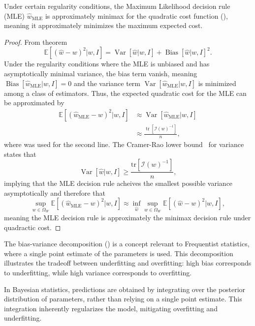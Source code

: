\begin{corollary}
	\label{cor:MLE_minimax}
	Under certain regularity conditions, the Maximum Likelihood decision rule (MLE) $\hat{w}_{\text{MLE}}$ is approximately minimax for the quadratic cost function (), meaning it approximately minimizes the maximum expected cost.
	
	\begin{proof}
		From theorem 
		\begin{equation}
			\mathbb{E}[(\hat{w}-w)^2|w,I] = \operatorname{Var}[\hat{w}|w,I]+\operatorname{Bias}[\hat{w}|w,I]^2.
		\end{equation}
		Under the regularity conditions where the MLE is unbiased and has asymptotically minimal variance, the bias term vanish, meaning $\operatorname{Bias}[\hat{w}_{\text{MLE}}|w,I] = 0$ and the variance term $\operatorname{Var}[\hat{w}_{\text{MLE}}|w,I]$ is minimized among a class of estimators. Thus, the expected quadratic cost for the MLE can be approximated by
		\begin{equation}
			\begin{split}
				\mathbb{E}[(\hat{w}_{\text{MLE}}-w)^2|w,I] &\approx \operatorname{Var}[\hat{w}_{\text{MLE}}|w,I]\\
				&\approx \frac{\operatorname{tr}[\mathcal{I}(w)^{-1}]}{n},
			\end{split}
		\end{equation}
		where  was used for the second line. The Cramer-Rao lower bound~\citep{Rao1973Linear} for variance states that 
		\begin{equation}
			\operatorname{Var}[\hat{w}|w,I]\geq \frac{\text{tr}[\mathcal{I}(w)^{-1}]}{n},
		\end{equation}
		implying that the MLE decision rule acheives the smallest possible variance asymptotically and therefore that 
		\begin{equation}
			\sup_{w\in \Omega_W}\mathbb{E}[(\hat{w}_{\text{MLE}}-w)^2|w,I]\approx \inf_{\hat{w}} \sup_{w \in \Omega_W} \mathbb{E}[(\hat{w} - w)^2|w,I],
		\end{equation}
		meaning the MLE decision rule is approximately the minimax decision rule under quadractic cost.
	\end{proof}
\end{corollary}

\begin{example}
	The bias-variance decomposition () is a concept relevant to Frequentist statistics, where a single point estimate of the parameters is used. This decomposition illustrates the tradeoff between underfitting and overfitting: high bias corresponds to underfitting, while high variance corresponds to overfitting. \newline
	
	In Bayesian statistics, predictions are obtained by integrating over the posterior distribution of parameters, rather than relying on a single point estimate. This integration inherently regularizes the model, mitigating overfitting and underfitting.
\end{example}


